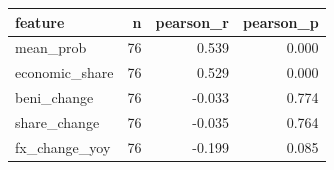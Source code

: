\begin{tabular}{lrrr}
\toprule
feature & n & pearson\_r & pearson\_p \\
\midrule
mean\_prob & 76 & 0.539 & 0.000 \\
economic\_share & 76 & 0.529 & 0.000 \\
beni\_change & 76 & -0.033 & 0.774 \\
share\_change & 76 & -0.035 & 0.764 \\
fx\_change\_yoy & 76 & -0.199 & 0.085 \\
\bottomrule
\end{tabular}
